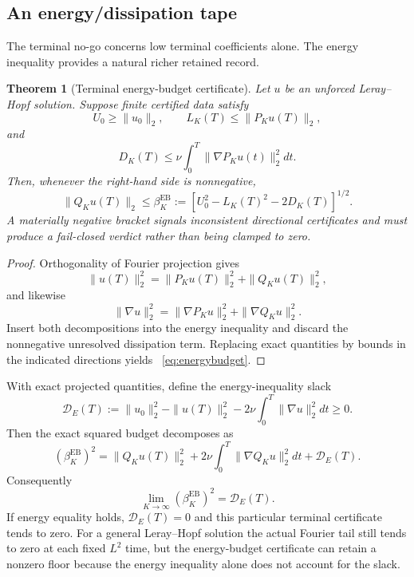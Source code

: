 \documentclass[11pt]{article}
\newtheorem{theorem}{Theorem}
\theoremstyle{definition}
\begin{document}
\subsection{An energy/dissipation tape}

The terminal no-go concerns low terminal coefficients alone.  The energy inequality provides a
natural richer retained record.

\begin{theorem}[Terminal energy-budget certificate]\label{thm:energybudget}
Let $u$ be an unforced Leray--Hopf solution.  Suppose finite certified data satisfy
\[
U_0\ge\|u_0\|_2,
\qquad
L_K(T)\le\|P_Ku(T)\|_2,
\]
and
\[
D_K(T)\le
\nu\int_0^T\|\nabla P_Ku(t)\|_2^2dt.
\]
Then, whenever the right-hand side is nonnegative,
\begin{equation}\label{eq:energybudget}
\boxed{
\|Q_Ku(T)\|_2
\le
\beta_K^{\mathrm{EB}}
:=
\left[U_0^2-L_K(T)^2-2D_K(T)\right]^{1/2}.
}
\end{equation}
A materially negative bracket signals inconsistent directional certificates and must produce a
fail-closed verdict rather than being clamped to zero.
\end{theorem}

\begin{proof}
Orthogonality of Fourier projection gives
\[
\|u(T)\|_2^2=\|P_Ku(T)\|_2^2+\|Q_Ku(T)\|_2^2,
\]
and likewise
\[
\|\nabla u\|_2^2
=\|\nabla P_Ku\|_2^2+\|\nabla Q_Ku\|_2^2.
\]
Insert both decompositions into the energy inequality and discard the nonnegative unresolved
dissipation term.  Replacing exact quantities by bounds in the indicated directions yields
~\eqref{eq:energybudget}.
\end{proof}

With exact projected quantities, define the energy-inequality slack
\begin{equation}\label{eq:defect}
\mathcal D_E(T)
:=\|u_0\|_2^2-\|u(T)\|_2^2
-2\nu\int_0^T\|\nabla u\|_2^2dt\ge0.
\end{equation}
Then the exact squared budget decomposes as
\begin{equation}\label{eq:floor}
(\beta_K^{\mathrm{EB}})^2
=\|Q_Ku(T)\|_2^2
+2\nu\int_0^T\|\nabla Q_Ku\|_2^2dt
+\mathcal D_E(T).
\end{equation}
Consequently
\[
\lim_{K\to\infty}(\beta_K^{\mathrm{EB}})^2=\mathcal D_E(T).
\]
If energy equality holds, $\mathcal D_E(T)=0$ and this particular terminal certificate tends to
zero.  For a general Leray--Hopf solution the actual Fourier tail still tends to zero at each fixed
$L^2$ time, but the energy-budget certificate can retain a nonzero floor because the energy
inequality alone does not account for the slack.
\end{document}
